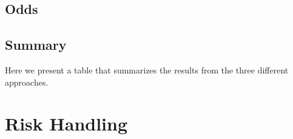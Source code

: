 \subsection{Odds}


\subsection{Summary}
Here we present a table that summarizes the results from the three different approaches. 

\section{Risk Handling}


